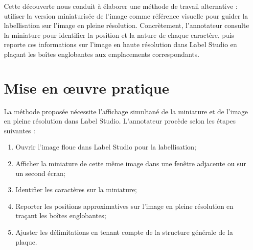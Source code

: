 \documentclass[twocolumn]{el-author}
\begin{document}

Cette découverte nous conduit à élaborer une méthode de travail alternative : utiliser la version miniaturisée de l'image comme référence visuelle pour guider la labellisation sur l'image en pleine résolution. Concrètement, l'annotateur consulte la miniature pour identifier la position et la nature de chaque caractère, puis reporte ces informations sur l'image en haute résolution dans Label Studio en plaçant les boîtes englobantes aux emplacements correspondants.

\section{Mise en œuvre pratique}

La méthode proposée nécessite l'affichage simultané de la miniature et de l'image en pleine résolution dans Label Studio. L'annotateur procède selon les étapes suivantes :

\begin{enumerate}
\item Ouvrir l'image floue dans Label Studio pour la labellisation;
\item Afficher la miniature de cette même image dans une fenêtre adjacente ou sur un second écran;
\item Identifier les caractères sur la miniature;
\item Reporter les positions approximatives sur l'image en pleine résolution en traçant les boîtes englobantes;
\item Ajuster les délimitations en tenant compte de la structure générale de la plaque.
\end{enumerate}
\end{document}
